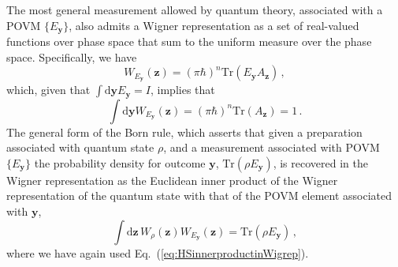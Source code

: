 \documentclass[pra,superscriptaddress,nofootinbib,12pt]{revtex4-2}
\begin{document}
The most general measurement allowed by quantum theory, associated
with a POVM $\{E_{\mathbf{y}}\}$, also admits a Wigner representation as a
set of real-valued functions over phase space that sum to the uniform measure over the phase space.  Specifically, we have
\begin{equation}
  W_{E_{\mathbf{y}}}(\mathbf{z})=(\pi \hbar)^n \mathrm{Tr}(E_{\mathbf{y}} A_{\mathbf{z}})\,,
\end{equation}
which, given that $\int \mathrm{d}{\mathbf{y}} E_{\mathbf{y}}=I$, implies that
\begin{equation}
  \int \mathrm{d}{\mathbf{y}} W_{E_{\mathbf{y}}}(\mathbf{z})=(\pi \hbar)^n\mathrm{Tr}(A_{\mathbf{z}})=1\,.
\end{equation}
The general form of the Born rule, which asserts that given a
preparation associated with quantum state $\rho$, and a
measurement associated
with POVM $\{E_{\mathbf{y}}\}$ the probability density for outcome ${\mathbf{y}}$, $\textrm{Tr}(\rho E_{\mathbf{y}})$, is recovered in the Wigner representation as the Euclidean inner product of the Wigner representation of the quantum
state with that of the POVM element associated with $\mathbf{y}$,
\begin{equation}
  \int \mathrm{d}\mathbf{z}\,W_{\rho}(\mathbf{z})W_{E_{\mathbf{y}}}(\mathbf{z})=
  \mathrm{Tr}(\rho E_{\mathbf{y}})\,,  \label{eq:Bornrule}
\end{equation}
where we have again used Eq.~(\ref{eq:HSinnerproductinWigrep}).
\end{document}
